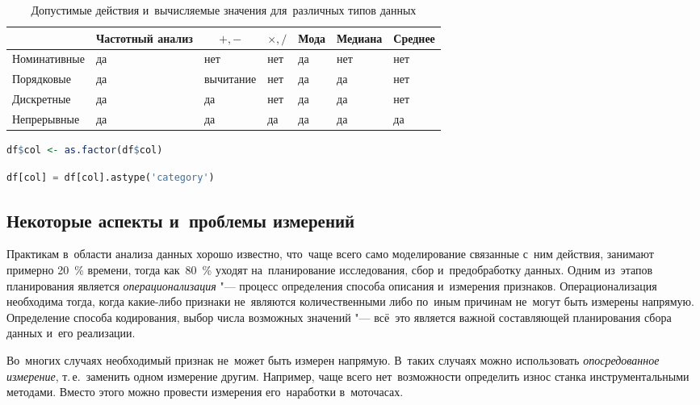 \documentclass[]{scrartcl}
\begin{document}
\begin{table}[ht]
	\caption{Допустимые действия и~вычисляемые значения для~различных типов данных}  \label{tab:calculations-for-diff-data}
	\centering%
	\begin{tabularx}{\textwidth}{X|XXXXXX} 
		\hline
		\multicolumn{1}{c|}{} & \multicolumn{1}{c}{Частотный анализ} & \multicolumn{1}{c}{$+, - $} & \multicolumn{1}{c}{$\times, /$} & \multicolumn{1}{c}{Мода} & \multicolumn{1}{c}{Медиана} & \multicolumn{1}{c}{Среднее} \\
		\hline\hline
		Номинативные
		& да
		& нет
		& нет
		& да
		& нет
		& нет		
		\\ \hline
		Порядковые
		& да
		& вычитание
		& нет
		& да
		& да
		& нет
		\\ \hline
		Дискретные
		& да
		& да
		& нет
		& да
		& да
		& нет
		\\ \hline
		Непрерывные
		& да
		& да
		& да
		& да
		& да
		& да     
		\\ \hline
	\end{tabularx}
\end{table}

\begin{lstlisting}[float, caption = Преобразование переменной в~фактор на~языке R, firstnumber=1, language = R, label= listing-convert-to-factor-R-1]
df$col <- as.factor(df$col)
\end{lstlisting}

\begin{lstlisting}[float, caption = Преобразование переменной в~фактор на~языке Python, firstnumber=1, language = Python, label = listing-convert-to-factor-Python-1]
df[col] = df[col].astype('category')
\end{lstlisting}

\subsection{Некоторые аспекты и~проблемы измерений}
Практикам в~области анализа данных хорошо известно, что~чаще всего само моделирование связанные с~ним действия, занимают примерно 20~\% времени, тогда как~80~\% уходят на~планирование исследования, сбор и~предобработку данных. Одним из~этапов планирования является \emph{операционализация} "---  процесс определения способа описания и~измерения признаков. Операционализация необходима тогда, когда какие-либо признаки не~являются количественными либо по~иным причинам не~могут быть измерены напрямую. Определение способа кодирования, выбор числа возможных значений "--- всё~это является важной составляющей планирования сбора данных и~его реализации.
\par
Во~многих случаях необходимый признак не~может быть измерен напрямую. В~таких случаях можно использовать \emph{опосредованное измерение}, т.\,е.~заменить одном измерение другим. Например, чаще всего нет~возможности определить износ станка инструментальными методами. Вместо этого можно провести измерения его~наработки в~моточасах.
\end{document}
